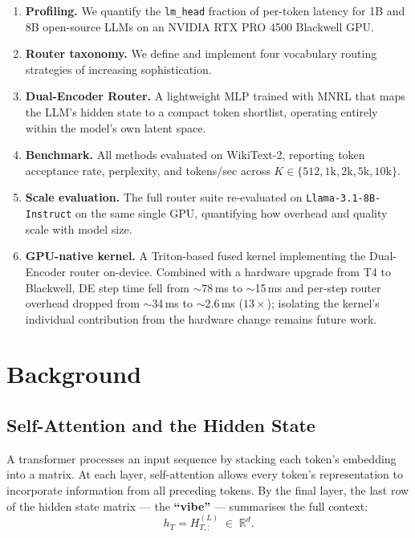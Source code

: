 \documentclass[twocolumn,10pt]{article}
\newcommand{\code}[1]{\texttt{#1}}
\begin{document}
\begin{enumerate}[leftmargin=*, itemsep=0pt, topsep=2pt]
  \item \textbf{Profiling.} We quantify the \code{lm\_head} fraction of
        per-token latency for 1B and 8B open-source LLMs on an NVIDIA RTX PRO
        4500 Blackwell GPU.
  \item \textbf{Router taxonomy.} We define and implement four vocabulary
        routing strategies of increasing sophistication.
  \item \textbf{Dual-Encoder Router.} A lightweight MLP trained with MNRL
        that maps the LLM's hidden state to a compact token shortlist,
        operating entirely within the model's own latent space.
  \item \textbf{Benchmark.} All methods evaluated on WikiText-2, reporting
        token acceptance rate, perplexity, and tokens/sec across
        $K \in \{512,1\text{k},2\text{k},5\text{k},10\text{k}\}$.
  \item \textbf{Scale evaluation.} The full router suite re-evaluated on
        \code{Llama-3.1-8B-Instruct} on the same single GPU, quantifying how
        overhead and quality scale with model size.
  \item \textbf{GPU-native kernel.} A Triton-based fused kernel implementing
        the Dual-Encoder router on-device. Combined with a hardware upgrade
        from T4 to Blackwell, DE step time fell from $\sim$78\,ms to
        $\sim$15\,ms and per-step router overhead dropped from $\sim$34\,ms to
        $\sim$2.6\,ms ($13\times$); isolating the kernel's individual
        contribution from the hardware change remains future work.
\end{enumerate}

\section{Background}

\subsection{Self-Attention and the Hidden State}

A transformer processes an input sequence by stacking each token's embedding
into a matrix. At each layer, self-attention allows every token's
representation to incorporate information from all preceding tokens. By the
final layer, the last row of the hidden state matrix --- the \textbf{``vibe''} ---
summarises the full context:
\[
  h_T = H^{(L)}_{T,:} \;\in\; \mathbb{R}^{d}.
\]
\end{document}
